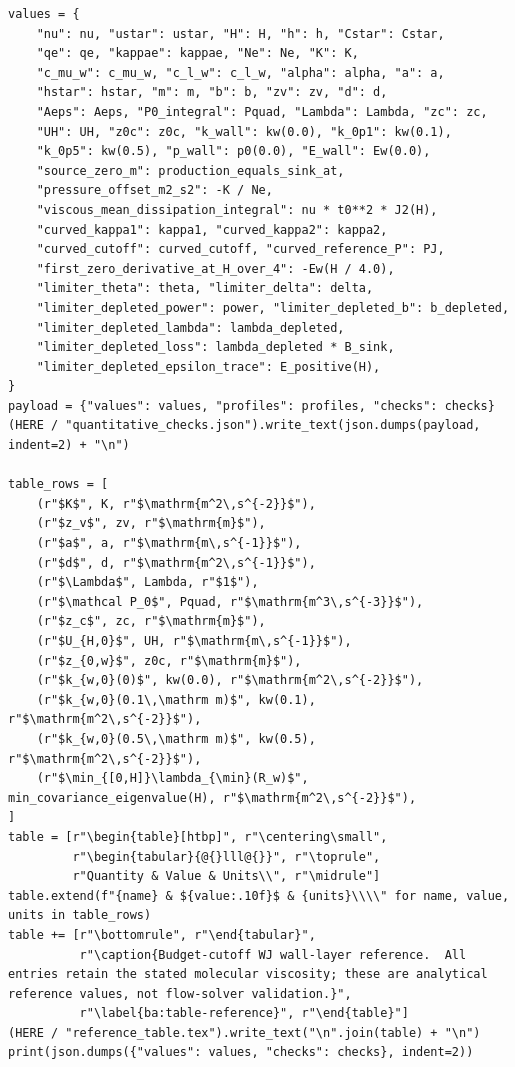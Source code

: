 \documentclass[11pt,a4paper]{article}
\numberwithin{equation}{section}
\begin{document}
\begin{lstlisting}[style=py]
values = {
    "nu": nu, "ustar": ustar, "H": H, "h": h, "Cstar": Cstar,
    "qe": qe, "kappae": kappae, "Ne": Ne, "K": K,
    "c_mu_w": c_mu_w, "c_l_w": c_l_w, "alpha": alpha, "a": a,
    "hstar": hstar, "m": m, "b": b, "zv": zv, "d": d,
    "Aeps": Aeps, "P0_integral": Pquad, "Lambda": Lambda, "zc": zc,
    "UH": UH, "z0c": z0c, "k_wall": kw(0.0), "k_0p1": kw(0.1),
    "k_0p5": kw(0.5), "p_wall": p0(0.0), "E_wall": Ew(0.0),
    "source_zero_m": production_equals_sink_at,
    "pressure_offset_m2_s2": -K / Ne,
    "viscous_mean_dissipation_integral": nu * t0**2 * J2(H),
    "curved_kappa1": kappa1, "curved_kappa2": kappa2,
    "curved_cutoff": curved_cutoff, "curved_reference_P": PJ,
    "first_zero_derivative_at_H_over_4": -Ew(H / 4.0),
    "limiter_theta": theta, "limiter_delta": delta,
    "limiter_depleted_power": power, "limiter_depleted_b": b_depleted,
    "limiter_depleted_lambda": lambda_depleted,
    "limiter_depleted_loss": lambda_depleted * B_sink,
    "limiter_depleted_epsilon_trace": E_positive(H),
}
payload = {"values": values, "profiles": profiles, "checks": checks}
(HERE / "quantitative_checks.json").write_text(json.dumps(payload, indent=2) + "\n")

table_rows = [
    (r"$K$", K, r"$\mathrm{m^2\,s^{-2}}$"),
    (r"$z_v$", zv, r"$\mathrm{m}$"),
    (r"$a$", a, r"$\mathrm{m\,s^{-1}}$"),
    (r"$d$", d, r"$\mathrm{m^2\,s^{-1}}$"),
    (r"$\Lambda$", Lambda, r"$1$"),
    (r"$\mathcal P_0$", Pquad, r"$\mathrm{m^3\,s^{-3}}$"),
    (r"$z_c$", zc, r"$\mathrm{m}$"),
    (r"$U_{H,0}$", UH, r"$\mathrm{m\,s^{-1}}$"),
    (r"$z_{0,w}$", z0c, r"$\mathrm{m}$"),
    (r"$k_{w,0}(0)$", kw(0.0), r"$\mathrm{m^2\,s^{-2}}$"),
    (r"$k_{w,0}(0.1\,\mathrm m)$", kw(0.1), r"$\mathrm{m^2\,s^{-2}}$"),
    (r"$k_{w,0}(0.5\,\mathrm m)$", kw(0.5), r"$\mathrm{m^2\,s^{-2}}$"),
    (r"$\min_{[0,H]}\lambda_{\min}(R_w)$", min_covariance_eigenvalue(H), r"$\mathrm{m^2\,s^{-2}}$"),
]
table = [r"\begin{table}[htbp]", r"\centering\small",
         r"\begin{tabular}{@{}lll@{}}", r"\toprule",
         r"Quantity & Value & Units\\", r"\midrule"]
table.extend(f"{name} & ${value:.10f}$ & {units}\\\\" for name, value, units in table_rows)
table += [r"\bottomrule", r"\end{tabular}",
          r"\caption{Budget-cutoff WJ wall-layer reference.  All entries retain the stated molecular viscosity; these are analytical reference values, not flow-solver validation.}",
          r"\label{ba:table-reference}", r"\end{table}"]
(HERE / "reference_table.tex").write_text("\n".join(table) + "\n")
print(json.dumps({"values": values, "checks": checks}, indent=2))


\end{lstlisting}
\end{document}
